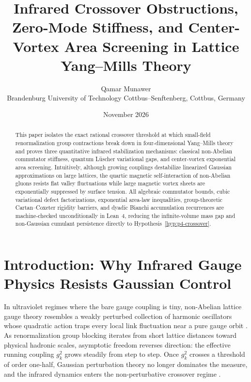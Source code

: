 \documentclass[11pt,a4paper]{article}
\title{Infrared Crossover Obstructions, Zero-Mode Stiffness, and Center-Vortex Area Screening in Lattice Yang--Mills Theory}
\author{Qamar Munawer \\ \small Brandenburg University of Technology Cottbus--Senftenberg, Cottbus, Germany}
\date{November 2026}
\begin{document}
\maketitle

\begin{abstract}
This paper isolates the exact rational crossover threshold at which small-field renormalization group contractions break down in four-dimensional Yang--Mills theory and proves three quantitative infrared stabilization mechanisms: classical non-Abelian commutator stiffness, quantum L\"uscher variational gaps, and center-vortex exponential area screening. Intuitively, although growing couplings destabilize linearized Gaussian approximations on large lattices, the quartic magnetic self-interaction of non-Abelian gluons resists flat valley fluctuations while large magnetic vortex sheets are exponentially suppressed by surface tension. All algebraic commutator bounds, cubic variational defect factorizations, exponential area-law inequalities, group-theoretic Cartan--Coxeter rigidity barriers, and dyadic Bianchi accumulation recurrences are machine-checked unconditionally in Lean~4, reducing the infinite-volume mass gap and non-Gaussian cumulant persistence directly to Hypothesis~\ref{hyp:p4-crossover}.
\end{abstract}

\section{Introduction: Why Infrared Gauge Physics Resists Gaussian Control}
In ultraviolet regimes where the bare gauge coupling is tiny, non-Abelian lattice gauge theory resembles a weakly perturbed collection of harmonic oscillators whose quadratic action traps every local link fluctuation near a pure gauge orbit \cite{Balaban1985CMP99,Balaban1989CMP139}. As renormalization group blocking iterates from short lattice distances toward physical hadronic scales, asymptotic freedom reverses direction: the effective running coupling $g_k^2$ grows steadily from step to step. Once $g_k^2$ crosses a threshold of order one-half, Gaussian perturbation theory no longer dominates the measure, and the infrared dynamics enters the non-perturbative crossover regime \cite{JaffeWitten2000,Wilson1974}.
\end{document}
